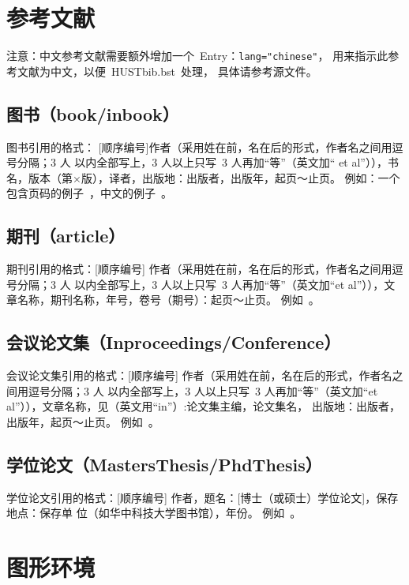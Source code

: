 \section{参考文献}

注意：中文参考文献需要额外增加一个~Entry：\verb|lang="chinese"|，
用来指示此参考文献为中文，以便~HUSTbib.bst~处理， 具体请参考源文件。

\subsection{图书（book/inbook）}

图书引用的格式：
[顺序编号]作者（采用姓在前，名在后的形式，作者名之间用逗号分隔；3 人
以内全部写上，3 人以上只写~3 人再加“等”（英文加“ et
al”）），书名，版本（第×版），译者，出版地：出版者，出版年，起页～止页。
例如：一个包含页码的例子~\cite{Collin}，中文的例子~\cite{jyzj1,jyzj2}。

\subsection{期刊（article）}

期刊引用的格式：[顺序编号]
作者（采用姓在前，名在后的形式，作者名之间用逗号分隔；3 人
以内全部写上，3 人以上只写~3 人再加“等”（英文加“et
al”）），文章名称，期刊名称，年号，卷号（期号）：起页～止页。
例如~。

\subsection{会议论文集（Inproceedings/Conference）}

会议论文集引用的格式：[顺序编号]
作者（采用姓在前，名在后的形式，作者名之间用逗号分隔；3 人
以内全部写上，3 人以上只写~3 人再加“等”（英文加“et
al”）），文章名称，见（英文用“in”）:论文集主编，论文集名，
出版地：出版者，出版年，起页～止页。
例如~。


\subsection{学位论文（MastersThesis/PhdThesis）}

学位论文引用的格式：[顺序编号]
作者，题名：[博士（或硕士）学位论文]，保存地点：保存单
位（如华中科技大学图书馆），年份。
例如~。

\section{图形环境}

